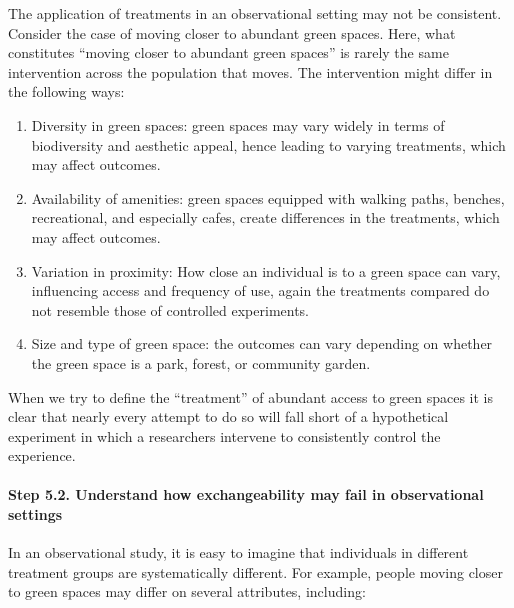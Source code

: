 \documentclass[
  singlecolumn]{article}
\let\oldparagraph\paragraph
\renewcommand{\paragraph}[1]{\oldparagraph{#1}\mbox{}}
\begin{document}
The application of treatments in an observational setting may not be
consistent. Consider the case of moving closer to abundant green spaces.
Here, what constitutes ``moving closer to abundant green spaces'' is
rarely the same intervention across the population that moves. The
intervention might differ in the following ways:

\begin{enumerate}
\def\labelenumi{\alph{enumi}.}
\item
  Diversity in green spaces: green spaces may vary widely in terms of
  biodiversity and aesthetic appeal, hence leading to varying
  treatments, which may affect outcomes.
\item
  Availability of amenities: green spaces equipped with walking paths,
  benches, recreational, and especially cafes, create differences in the
  treatments, which may affect outcomes.
\item
  Variation in proximity: How close an individual is to a green space
  can vary, influencing access and frequency of use, again the
  treatments compared do not resemble those of controlled experiments.
\item
  Size and type of green space: the outcomes can vary depending on
  whether the green space is a park, forest, or community garden.
\end{enumerate}

When we try to define the ``treatment'' of abundant access to green
spaces it is clear that nearly every attempt to do so will fall short of
a hypothetical experiment in which a researchers intervene to
consistently control the experience.

\paragraph{\texorpdfstring{\textbf{Step 5.2. Understand how
exchangeability may fail in observational
settings}}{Step 5.2. Understand how exchangeability may fail in observational settings}}\label{step-5.2.-understand-how-exchangeability-may-fail-in-observational-settings}

In an observational study, it is easy to imagine that individuals in
different treatment groups are systematically different. For example,
people moving closer to green spaces may differ on several attributes,
including:
\end{document}
